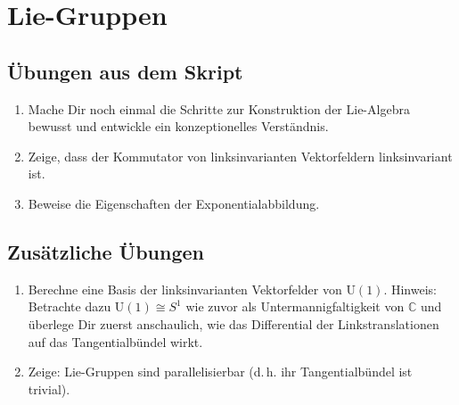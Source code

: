 \documentclass[a4paper]{scrartcl}
\begin{document}
	\section{Lie-Gruppen}
	\subsection{Übungen aus dem Skript}
	\begin{enumerate}
		\item Mache Dir noch einmal die Schritte zur Konstruktion der Lie-Algebra bewusst und entwickle ein konzeptionelles Verständnis.
		\item Zeige, dass der Kommutator von linksinvarianten Vektorfeldern linksinvariant ist.
		\item Beweise die Eigenschaften der Exponentialabbildung.
	\end{enumerate}
	\subsection{Zusätzliche Übungen}
	\begin{enumerate}
		\item Berechne eine Basis der linksinvarianten Vektorfelder von $\mathrm{U}(1)$. Hinweis: Betrachte dazu $\mathrm{U}(1)\cong S^1$ wie zuvor als Untermannigfaltigkeit von $\mathbb{C}$ und überlege Dir zuerst anschaulich, wie das Differential der Linkstranslationen auf das Tangentialbündel wirkt.
		\item Zeige: Lie-Gruppen sind parallelisierbar (d.\,h. ihr Tangentialbündel ist trivial).
	\end{enumerate}
\end{document}
